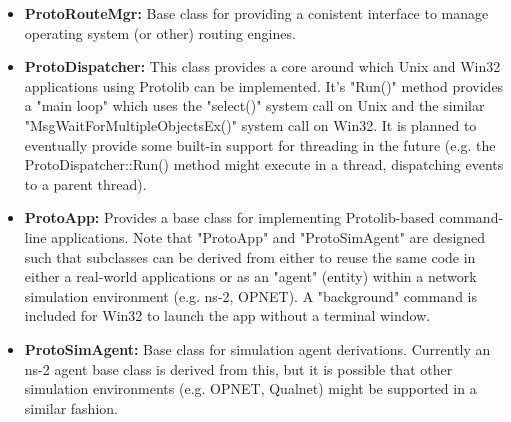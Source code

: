 \begin{itemize}
\item \textbf{ProtoRouteMgr:}   Base class for providing  a conistent
                 interface to manage operating system (or
                 other) routing engines.
\item \textbf{ProtoDispatcher:} This class provides a core around which Unix
                 and Win32 applications using Protolib can be
                 implemented.  It's "Run()" method provides a
                 "main loop" which uses the "select()" system
                 call on Unix and the similar
                 "MsgWaitForMultipleObjectsEx()" system call on
                 Win32.  It is planned to eventually provide
                 some built-in support for threading in the
                 future (e.g. the ProtoDispatcher::Run() method
                 might execute in a thread, dispatching events
                 to a parent thread).
\item \textbf{ProtoApp: }       Provides a base class for implementing
                 Protolib-based command-line applications. Note
                 that "ProtoApp" and "ProtoSimAgent" are
                 designed such that subclasses can be derived
                 from either to reuse the same code in either a
                 real-world applications or as an "agent"
                 (entity) within a network simulation
                 environment (e.g. ns-2, OPNET).  A "background"
                 command is included for Win32 to launch the
                 app without a terminal window.

\item \textbf{ProtoSimAgent:}   Base class for simulation agent derivations. 
                 Currently an ns-2 agent base class is derived
                 from this, but it is possible that other
                 simulation environments  (e.g. OPNET, Qualnet)
                 might be supported in a similar fashion.


\end{itemize}
